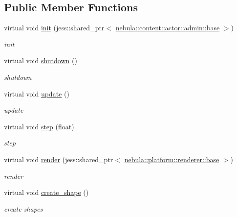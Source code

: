 \subsection*{Public Member Functions}
\begin{DoxyCompactItemize}
\item 
virtual void \hyperlink{classnebula_1_1content_1_1actor_1_1physics_1_1physx_1_1rigid__actor_aa97998670aef04432902309cf30a6d5e}{init} (jess::shared\_\-ptr$<$ \hyperlink{classnebula_1_1content_1_1actor_1_1admin_1_1base}{nebula::content::actor::admin::base} $>$)
\begin{DoxyCompactList}\small\item\em init \item\end{DoxyCompactList}\item 
virtual void \hyperlink{classnebula_1_1content_1_1actor_1_1physics_1_1physx_1_1rigid__actor_a0a7d4d923fa08fa0ae52b798978fab3f}{shutdown} ()
\begin{DoxyCompactList}\small\item\em shutdown \item\end{DoxyCompactList}\item 
virtual void \hyperlink{classnebula_1_1content_1_1actor_1_1physics_1_1physx_1_1rigid__actor_a72b8760ff690a21d9e248c0fe63baed4}{update} ()
\begin{DoxyCompactList}\small\item\em update \item\end{DoxyCompactList}\item 
virtual void \hyperlink{classnebula_1_1content_1_1actor_1_1physics_1_1physx_1_1rigid__actor_af46a50e7fc8184d0c4bfb93db4a84041}{step} (float)
\begin{DoxyCompactList}\small\item\em step \item\end{DoxyCompactList}\item 
virtual void \hyperlink{classnebula_1_1content_1_1actor_1_1physics_1_1physx_1_1rigid__actor_a0d7cabcd9cf67f5204e3ec2633e81641}{render} (jess::shared\_\-ptr$<$ \hyperlink{classnebula_1_1platform_1_1renderer_1_1base}{nebula::platform::renderer::base} $>$)
\begin{DoxyCompactList}\small\item\em render \item\end{DoxyCompactList}\item 
virtual void \hyperlink{classnebula_1_1content_1_1actor_1_1physics_1_1physx_1_1rigid__actor_a8039ad67e392b45cffebcde5ffb37620}{create\_\-shape} ()
\begin{DoxyCompactList}\small\item\em create shapes \item\end{DoxyCompactList}\end{DoxyCompactItemize}
